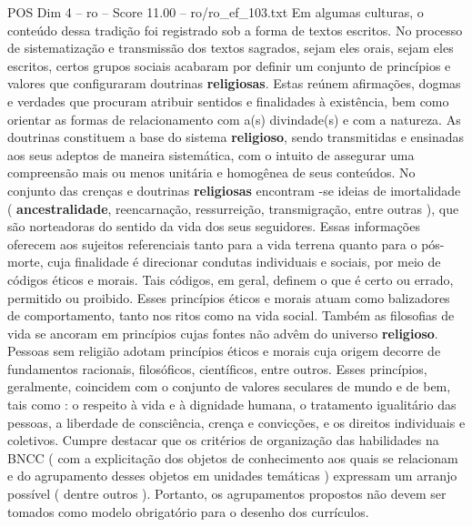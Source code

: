 \begin{textsample}{POS Dim 4 – ro – Score 11.00 – ro/ro\_ef\_103.txt}
Em algumas culturas, o conteúdo dessa tradição foi registrado sob a forma de textos escritos.
No processo de sistematização e transmissão dos textos sagrados, sejam eles orais, sejam eles escritos, certos grupos sociais acabaram por definir um conjunto de princípios e valores que configuraram doutrinas \textbf{religiosas}.
Estas reúnem afirmações, dogmas e verdades que procuram atribuir sentidos e finalidades à existência, bem como orientar as formas de relacionamento com a(s) divindade(s) e com a natureza.
As doutrinas constituem a base do sistema \textbf{religioso}, sendo transmitidas e ensinadas aos seus adeptos de maneira sistemática, com o intuito de assegurar uma compreensão mais ou menos unitária e homogênea de seus conteúdos.
No conjunto das crenças e doutrinas \textbf{religiosas} encontram -se ideias de imortalidade ( \textbf{ancestralidade}, reencarnação, ressurreição, transmigração, entre outras ), que são norteadoras do sentido da vida dos seus seguidores.
Essas informações oferecem aos sujeitos referenciais tanto para a vida terrena quanto para o pós-morte, cuja finalidade é direcionar condutas individuais e sociais, por meio de códigos éticos e morais.
Tais códigos, em geral, definem o que é certo ou errado, permitido ou proibido.
Esses princípios éticos e morais atuam como balizadores de comportamento, tanto nos ritos como na vida social.
Também as filosofias de vida se ancoram em princípios cujas fontes não advêm do universo \textbf{religioso}.
Pessoas sem religião adotam princípios éticos e morais cuja origem decorre de fundamentos racionais, filosóficos, científicos, entre outros.
Esses princípios, geralmente, coincidem com o conjunto de valores seculares de mundo e de bem, tais como : o respeito à vida e à dignidade humana, o tratamento igualitário das pessoas, a liberdade de consciência, crença e convicções, e os direitos individuais e coletivos.
Cumpre destacar que os critérios de organização das habilidades na BNCC ( com a explicitação dos objetos de conhecimento aos quais se relacionam e do agrupamento desses objetos em unidades temáticas ) expressam um arranjo possível ( dentre outros ).
Portanto, os agrupamentos propostos não devem ser tomados como modelo obrigatório para o desenho dos currículos.

\end{textsample}
